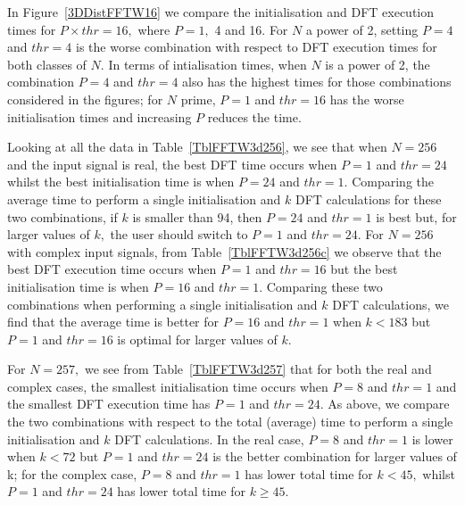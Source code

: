 \documentclass[a4paper]{article}
\begin{document}
In Figure~\ref{3DDistFFTW16} we compare the initialisation and DFT
execution times for $P\times thr=16,$ where $P=1,$ 4 and 16. For $N$ a
power of 2, setting $P=4$ and $thr=4$ is the worse combination with
respect to DFT execution times for both classes of $N.$ In terms of
intialisation times, when $N$ is a power of 2, the combination $P=4$
and $thr=4$ also has the highest times for those combinations
considered in the figures; for $N$ prime, $P=1$ and $thr=16$ has the
worse initialisation times and increasing $P$ reduces the time.

Looking at all the data in Table~\ref{TblFFTW3d256}, we see that when
$N=256$ and the input signal is real, the best DFT time occurs when
$P=1$ and $thr=24$ whilst the best initialisation time is when $P=24$
and $thr=1.$ Comparing the average time to perform a single
initialisation and $k$ DFT calculations for these two combinations, if
$k$ is smaller than 94, then $P=24$ and $thr=1$ is best but, for larger
values of $k,$ the user should switch to $P=1$ and $thr=24.$ For
$N=256$ with complex input signals, from Table~\ref{TblFFTW3d256c} we
observe that the best DFT execution time occurs when $P=1$ and
$thr=16$ but the best initialisation time is when $P=16$ and $thr=1.$
Comparing these two combinations when performing a single
initialisation and $k$ DFT calculations, we find that the average time
is better for $P=16$ and $thr=1$ when $k<183$ but $P=1$ and $thr=16$
is optimal for larger values of $k.$

For $N=257,$ we see from Table~\ref{TblFFTW3d257} that for both the
real and complex cases, the smallest initialisation time occurs when
$P=8$ and $thr=1$ and the smallest DFT execution time has $P=1$ and
$thr=24.$ As above, we compare the two combinations with respect to
the total (average) time to perform a single initialisation and $k$
DFT calculations. In the real case, $P=8$ and $thr=1$ is lower when
$k<72$ but $P=1$ and $thr=24$ is the better combination for larger
values of k; for the complex case, $P=8$ and $thr=1$ has lower total
time for $k<45,$ whilst $P=1$ and $thr=24$ has lower total time for
$k\ge 45.$
\end{document}
